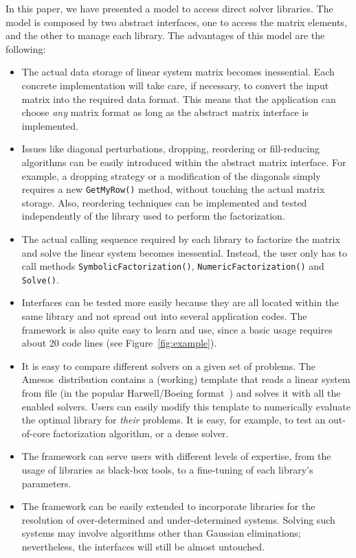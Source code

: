 \documentclass[acmtocl]{acmtrans2m}
\newcommand{\amesos}{{\sc Amesos}}
\begin{document}
In this paper, we have presented a model to access direct
solver libraries. The model is composed by two abstract interfaces, one to
access the matrix elements, and the other to manage each library.
The advantages of this model are the following:
\begin{itemize}

\item The actual data storage of linear system matrix becomes inessential.
Each concrete implementation will take care, if necessary, to convert the
input matrix into the required data format. This means that the
application can choose {\sl any} matrix format as long as the abstract
matrix interface is implemented.

\item Issues like diagonal perturbations, dropping, reordering or
fill-reducing algorithms 
can be easily introduced within the abstract matrix interface.
For example, a dropping strategy or a modification of the diagonals simply
requires a new \verb!GetMyRow()! method, without touching the actual matrix
storage. Also, reordering techniques can be implemented and tested
independently of the library used to perform the factorization.

\item The actual calling sequence required by each library to factorize the
matrix and solve the linear system becomes inessential. Instead, the user only
has to call methods \verb!SymbolicFactorization()!, \verb!NumericFactorization()! and
\verb!Solve()!.

\item Interfaces can be tested more easily because they are all located within
the same library and not spread out into several application codes. The
framework is also quite easy to learn and use, since a basic usage 
requires about 20 code lines (see Figure~\ref{fig:example}).

\item It is easy to compare different solvers on a given set of problems. The
\amesos\ distribution contains a (working) template that reads a linear system
from file (in the popular Harwell/Boeing format~\cite{duff89sparse}) and solves it with all the
enabled solvers. Users can easily modify this template to numerically evaluate
the optimal library for {\sl their} problems.
It is easy, for example, to test an out-of-core factorization algorithm, or a
dense solver.

\item
The framework can serve users with different levels of expertise, from the
usage of libraries as black-box tools, to a fine-tuning of each library's
parameters.

\item 
The framework can be easily extended to incorporate libraries for the
resolution of over-determined and under-determined systems. Solving such
systems may involve algorithms other than Gaussian eliminations; nevertheless,
the interfaces will still be almost untouched.

\end{itemize}
\end{document}
